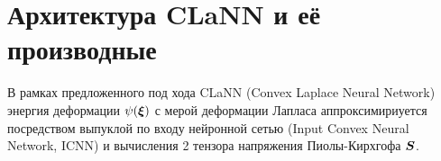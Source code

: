 



\section{Архитектура CLaNN и её производные}


В рамках предложенного под  хода CLaNN (Convex Laplace Neural Network) энергия деформации \(\psi(\boldsymbol{\xi})\)
с мерой деформации Лапласа аппроксимириуется посредством выпуклой по входу нейронной сетью (Input Convex Neural Network, ICNN) \cite{icnn2017}
и вычисления 2 тензора напряжения Пиолы-Кирхгофа \(\boldsymbol{S}\). 



